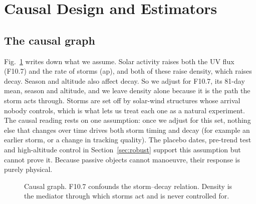 \section{Causal Design and Estimators}
\label{sec:design}

\subsection{The causal graph}
Fig.~\ref{fig:dag} writes down what we assume. Solar activity raises both the UV flux (F10.7)
and the rate of storms (ap), and both of these raise density, which raises decay. Season and
altitude also affect decay. So we adjust for F10.7, its 81-day mean, season and altitude, and
we leave density alone because it is the path the storm acts through. Storms are set off by
solar-wind structures whose arrival nobody controls, which is what lets us treat each one as a
natural experiment. The causal reading rests on one assumption: once we adjust for this set,
nothing else that changes over time drives both storm timing and decay (for example an earlier
storm, or a change in tracking quality). The placebo dates, pre-trend test and high-altitude
control in Section~\ref{sec:robust} support this assumption but cannot prove it. Because passive
objects cannot manoeuvre, their response is purely physical.

\begin{figure}[t]
\centering
{}
\caption{Causal graph. F10.7 confounds the storm--decay relation. Density is the mediator
through which storms act and is never controlled for.}
\label{fig:dag}
\end{figure}

